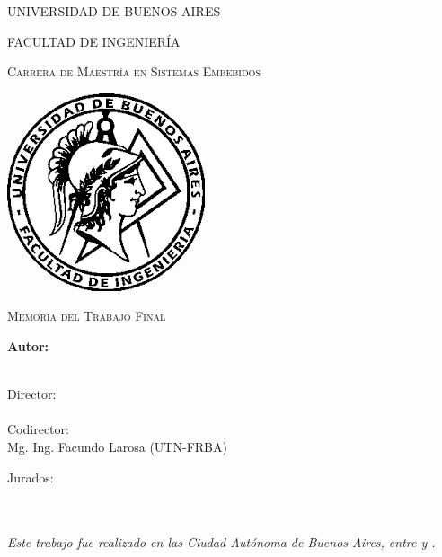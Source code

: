\documentclass[
11pt, %
spanish,
singlespacing, %
parskip, %
headsepline, %
]{MastersDoctoralThesis} %
\author{Esp. Ing. Martín Nicolás Menéndez} %
\begin{document}
\frontmatter %

\pagestyle{plain} %


\begin{titlepage}
\begin{center}

{\scshape\LARGE UNIVERSIDAD DE BUENOS AIRES\par}\vspace{0.1cm} %
{\scshape\LARGE FACULTAD DE INGENIERÍA\par}\vspace{0.1cm} %
{\scshape\LARGE Carrera de Maestría en Sistemas Embebidos\par}\vspace{1cm} %

\includegraphics[width=.3\textwidth]{./Figures/logoFIUBA.png}
\vspace{1cm}

\textsc{\Large Memoria del Trabajo Final}\\[0.5cm] %

{\huge \bfseries \ttitle\par}\vspace{0.4cm} %

\vspace{1cm}
\LARGE\textbf{Autor:\\
\authorname}\\ %

\vspace{1cm}

\large
\vspace{10px}
{Director:} \\
{\supname}\\ %
{Codirector:} \\
{Mg. Ing. Facundo Larosa (UTN-FRBA)} %

\vspace{1cm}
Jurados:\\
\jurunoname\\
\jurdosname\\
\jurtresname
 
\vfill
\textit{Este trabajo fue realizado en las Ciudad Autónoma de Buenos Aires, entre \fechaINICIOname \hspace{1px} y \fechaFINALname.}
\end{center}
\end{titlepage}
\end{document}
